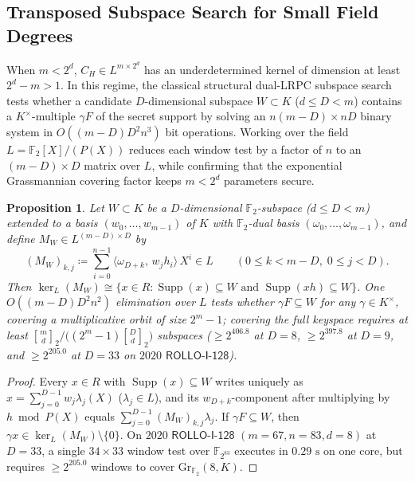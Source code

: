 \documentclass[11pt,a4paper]{article}
\newtheorem{proposition}[theorem]{Proposition}
\theoremstyle{definition}
\theoremstyle{remark}
\newcommand{\F}{\mathbb{F}}
\newcommand{\Ftwo}{\mathbb{F}_2}
\newcommand{\Gr}{\mathrm{Gr}}
\newcommand{\Supp}{\operatorname{Supp}}
\begin{document}
\subsection{Transposed Subspace Search for Small Field Degrees}
\label{subsec:pk-window}

When $m < 2^d$, $C_H \in L^{m \times 2^d}$ has an underdetermined kernel of dimension at least $2^d - m > 1$. In this regime, the classical structural dual-LRPC subspace search~\cite{GMRZ13,HT15,ROLLO20} tests whether a candidate $D$-dimensional subspace $W \subset K$ ($d \le D < m$) contains a $K^\times$-multiple $\gamma F$ of the secret support by solving an $n(m - D) \times n D$ binary system in $O((m - D)D^2 n^3)$ bit operations. Working over the field $L = \Ftwo[X]/(P(X))$ reduces each window test by a factor of $n$ to an $(m - D) \times D$ matrix over $L$, while confirming that the exponential Grassmannian covering factor keeps $m < 2^d$ parameters secure.

\begin{proposition}
\label{prop:window}
Let $W \subset K$ be a $D$-dimensional $\Ftwo$-subspace ($d \le D < m$) extended to a basis $(w_0, \dots, w_{m-1})$ of $K$ with $\Ftwo$-dual basis $(\omega_0, \dots, \omega_{m-1})$, and define $M_W \in L^{(m - D) \times D}$ by
\[
    (M_W)_{k, j} \coloneqq \sum_{i=0}^{n-1} \langle \omega_{D+k},\, w_j h_i \rangle \, X^i \in L \qquad (0 \le k < m - D,\; 0 \le j < D).
\]
Then $\ker_L(M_W) \cong \{x \in R : \Supp(x) \subseteq W \text{ and } \Supp(x h) \subseteq W\}$. One $O((m - D) D^2 n^2)$ elimination over $L$ tests whether $\gamma F \subseteq W$ for any $\gamma \in K^\times$, covering a multiplicative orbit of size $2^m - 1$; covering the full keyspace requires at least $\genfrac{[}{]}{0pt}{}{m}{d}_2 \big/ \bigl((2^m - 1)\genfrac{[}{]}{0pt}{}{D}{d}_2\bigr)$ subspaces ($\ge 2^{406.8}$ at $D = 8$, $\ge 2^{397.8}$ at $D = 9$, and $\ge 2^{205.0}$ at $D = 33$ on $2020$ $\mathsf{ROLLO\text{-}I\text{-}128}$).
\end{proposition}

\begin{proof}
Every $x \in R$ with $\Supp(x) \subseteq W$ writes uniquely as $x = \sum_{j=0}^{D-1} w_j \lambda_j(X)$ ($\lambda_j \in L$), and its $w_{D+k}$-component after multiplying by $h \bmod P(X)$ equals $\sum_{j=0}^{D-1} (M_W)_{k,j} \lambda_j$. If $\gamma F \subseteq W$, then $\gamma x \in \ker_L(M_W) \setminus \{0\}$. On $2020$ $\mathsf{ROLLO\text{-}I\text{-}128}$ $(m=67, n=83, d=8)$ at $D = 33$, a single $34 \times 33$ window test over $\F_{2^{83}}$ executes in $0.29\text{ s}$ on one core, but requires $\ge 2^{205.0}$ windows to cover $\Gr_{\Ftwo}(8, K)$.
\end{proof}
\end{document}
